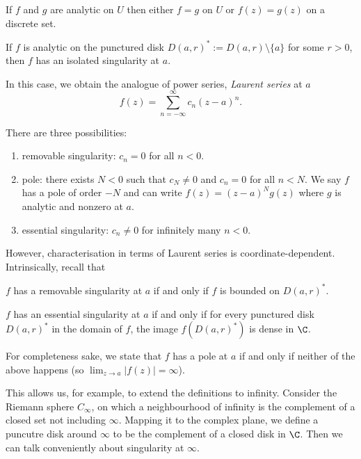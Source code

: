 \documentclass[a4paper]{article}
\begin{document}
\begin{corollary}
  If \(f\) and \(g\) are analytic on \(U\) then either \(f = g\) on \(U\) or \(f(z) = g(z)\) on a discrete set.
\end{corollary}

\begin{definition}
  If \(f\) is analytic on the punctured disk \(D(a, r)^* := D(a, r) \setminus \{a\}\) for some \(r > 0\), then \(f\) has an isolated singularity at \(a\).
\end{definition}

In this case, we obtain the analogue of power series, \emph{Laurent series} at \(a\)
\[
  f(z) = \sum_{n = -\infty}^{\infty} c_n (z - a)^n.
\]

There are three possibilities:
\begin{enumerate}
\item removable singularity: \(c_n = 0\) for all \(n < 0\).
\item pole: there exists \(N < 0\) such that \(c_N \neq 0\) and \(c_n = 0\) for all \(n < N\). We say \(f\) has a pole of order \(-N\) and can write \(f(z) = (z - a)^N g(z)\) where \(g\) is analytic and nonzero at \(a\).
\item essential singularity: \(c_n \neq 0\) for infinitely many \(n < 0\).
\end{enumerate}

However, characterisation in terms of Laurent series is coordinate-dependent. Intrinsically, recall that

\begin{theorem}
  \(f\) has a removable singularity at \(a\) if and only if \(f\) is bounded on \(D(a, r)^*\).
\end{theorem}

\begin{theorem}
  \(f\) has an essential singularity at \(a\) if and only if for every punctured disk \(D(a, r)^*\) in the domain of \(f\), the image \(f(D(a, r)^*)\) is dense in \(\C\).
\end{theorem}

For completeness sake, we state that \(f\) has a pole at \(a\) if and only if neither of the above happens (so \(\lim_{z \to a} |f(z)| = \infty\)).

This allows us, for example, to extend the definitions to infinity. Consider the Riemann sphere \(C_\infty\), on which a neighbourhood of infinity is the complement of a closed set not including \(\infty\). Mapping it to the complex plane, we define a puncutre disk around \(\infty\) to be the complement of a closed disk in \(\C\). Then we can talk conveniently about singularity at \(\infty\).
\end{document}
